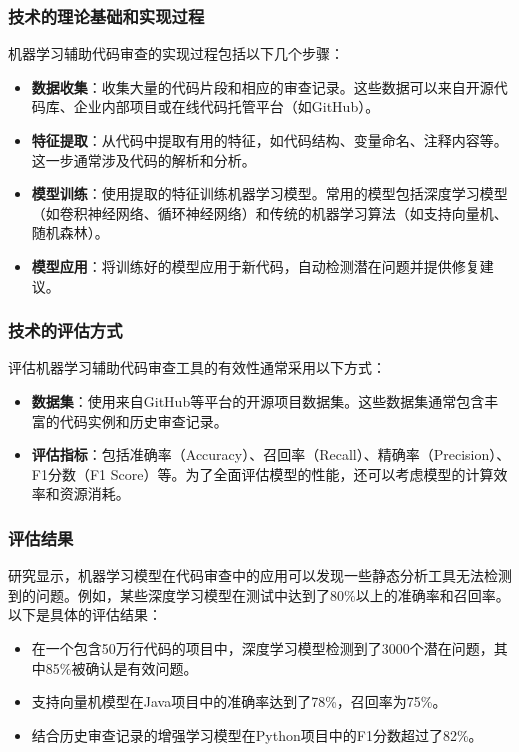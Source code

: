 \documentclass{article}
\begin{document}
\subsubsection{技术的理论基础和实现过程}

机器学习辅助代码审查的实现过程包括以下几个步骤：

\begin{itemize}
    \item \textbf{数据收集}：收集大量的代码片段和相应的审查记录。这些数据可以来自开源代码库、企业内部项目或在线代码托管平台（如GitHub）。
    \item \textbf{特征提取}：从代码中提取有用的特征，如代码结构、变量命名、注释内容等。这一步通常涉及代码的解析和分析。
    \item \textbf{模型训练}：使用提取的特征训练机器学习模型。常用的模型包括深度学习模型（如卷积神经网络、循环神经网络）和传统的机器学习算法（如支持向量机、随机森林）。
    \item \textbf{模型应用}：将训练好的模型应用于新代码，自动检测潜在问题并提供修复建议。
\end{itemize}

\subsubsection{技术的评估方式}

评估机器学习辅助代码审查工具的有效性通常采用以下方式：

\begin{itemize}
    \item \textbf{数据集}：使用来自GitHub等平台的开源项目数据集。这些数据集通常包含丰富的代码实例和历史审查记录。
    \item \textbf{评估指标}：包括准确率（Accuracy）、召回率（Recall）、精确率（Precision）、F1分数（F1 Score）等。为了全面评估模型的性能，还可以考虑模型的计算效率和资源消耗。
\end{itemize}

\subsubsection{评估结果}

研究显示，机器学习模型在代码审查中的应用可以发现一些静态分析工具无法检测到的问题。例如，某些深度学习模型在测试中达到了80\%以上的准确率和召回率。以下是具体的评估结果：

\begin{itemize}
    \item 在一个包含50万行代码的项目中，深度学习模型检测到了3000个潜在问题，其中85\%被确认是有效问题。
    \item 支持向量机模型在Java项目中的准确率达到了78\%，召回率为75\%。
    \item 结合历史审查记录的增强学习模型在Python项目中的F1分数超过了82\%。
\end{itemize}
\end{document}
